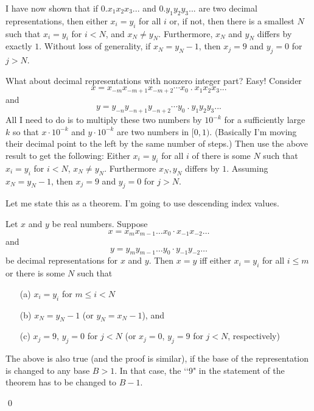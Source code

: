 I have now shown that if
$0.x_1x_2x_3...$
and
$0.y_1y_2y_3...$
are two decimal representations, then
either $x_i = y_i$ for all $i$ or, if not,
then there is a smallest $N$ such that
$x_i = y_i$ for $i < N$,
and $x_N \neq y_N$.
Furthermore,
$x_N$ and $y_N$ differs by exactly $1$.
Without loss of generality, if $x_N = y_N - 1$, then
$x_j = 9$ and $y_j = 0$ for $j > N$.

What about decimal representations with nonzero integer part?
Easy!
Consider
\[
x = x_{-m}x_{-m+1}x_{-m+2}\cdots x_0 \ . \ x_1x_2x_3...
\]
and
\[
y = y_{-n}y_{-n+1}y_{-n+2}\cdots y_0 \ . \ y_1y_2y_3...
\]
All I need to do is to multiply these two numbers
by $10^{-k}$ for a sufficiently large $k$
so that $x\cdot 10^{-k}$ and $y \cdot 10^{-k}$ are
two numbers in $[0,1)$.
  (Basically I'm moving their decimal point to the left
  by the same number of steps.)
  Then use the above result to get the following:
  Either $x_i = y_i$ for all $i$ of
  there is some $N$ such that $x_i = y_i$ for $i < N$,
  $x_N \neq y_N$.
  Furthermore $x_N, y_N$ differs by $1$.
  Assuming $x_N = y_N - 1$, then
  $x_j = 9$ and $y_j = 0$ for $j > N$.

  Let me state this as a theorem.
  I'm going to use descending index values.
  
  \begin{thm}
    Let $x$ and $y$ be real numbers.
    Suppose
    \[
    x = x_m x_{m - 1} \ldots x_0 \cdot x_{-1}x_{-2} \ldots
    \]
    and
    \[
    y = y_m y_{m - 1} \ldots y_0 \cdot y_{-1}y_{-2} \ldots
    \]
    be decimal representations for $x$ and $y$.
    Then $x = y$ iff
    either $x_i = y_i$ for all $i \leq m$ or
    there is some $N$ such that
    \begin{itemize}
    \item[\textnormal{(a)}] $x_i = y_i$ for $m \leq i < N$
    \item[\textnormal{(b)}] $x_N = y_N - 1$ (or $y_N = x_N - 1$),
      and
    \item[\textnormal{(c)}]
      $x_j = 9$, $y_j = 0$ for $j < N$
      (or $x_j = 0$, $y_j = 9$ for $j < N$, respectively)
    \end{itemize}
  \end{thm}

  The above is also true (and the proof is similar), if the base
  of the representation is changed to any base $B > 1$.
  In that case,
  the \lq\lq 9" in the statement of the theorem has to be changed to
  $B - 1$.
  
\qed

